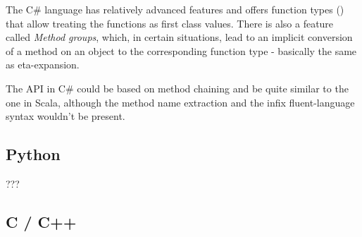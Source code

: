 The C\# language has relatively advanced features and offers function types () that allow treating the functions as first class values. There is also a feature called \textit{Method groups}, which, in certain situations, lead to an implicit conversion of a method on an object to the corresponding function type - basically the same as eta-expansion.


The API in C\# could be based on method chaining and be quite similar to the one in Scala, although the method name extraction and the infix fluent-language syntax wouldn't be present.

\subsection{Python}
???

\subsection{C / C++}